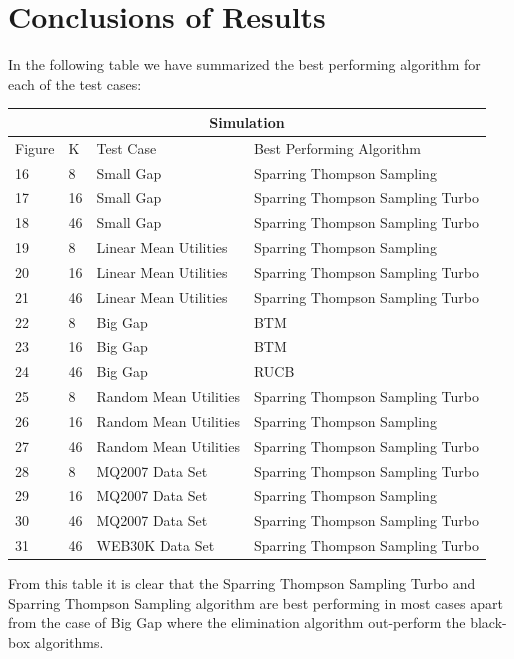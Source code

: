 \documentclass[MSc,beforeExam]{iitcsthesis}
\begin{document}
\section{Conclusions of Results}
In the following table we have summarized the best performing algorithm for each of the test cases:
\begin{table}[h!]
\centering
\begin{tabular}{ |p{1cm}|p{1cm}|p{4cm}|p{5cm}| }

\hline
 \multicolumn{4}{|c|}{Simulation} \\
 \hline
   \hline
Figure & K & Test Case & Best Performing Algorithm\\
\hline
  16     & 8  & Small Gap & Sparring Thompson Sampling\\
  \hline
  17     & 16  &  Small Gap & Sparring Thompson Sampling Turbo\\
  \hline
  18     & 46  &  Small Gap & Sparring Thompson Sampling Turbo\\
  \hline
  19     & 8  &  Linear Mean Utilities & Sparring Thompson Sampling\\
  \hline
  20     & 16  & Linear Mean Utilities & Sparring Thompson Sampling Turbo\\
  \hline
  21     & 46  & Linear Mean Utilities & Sparring Thompson Sampling Turbo \\
  \hline
  22     & 8  &  Big Gap & BTM \\
  \hline
  23     & 16  &  Big Gap & BTM \\
  \hline
  24     & 46  &  Big Gap & RUCB\\

  \hline
  25     & 8  &  Random Mean Utilities & Sparring Thompson Sampling Turbo \\
  \hline
  26     & 16  &  Random Mean Utilities & Sparring Thompson Sampling \\
  \hline
  27     & 46  &  Random Mean Utilities & Sparring Thompson Sampling Turbo \\
  \hline
  28     & 8  &  MQ2007 Data Set & Sparring Thompson Sampling Turbo\\
  \hline
  29     & 16  & MQ2007 Data Set & Sparring Thompson Sampling \\
  \hline
  30     & 46  & MQ2007 Data Set & Sparring Thompson Sampling Turbo \\
  \hline
  31     & 46  & WEB30K Data Set & Sparring Thompson Sampling Turbo \\
  \hline
\end{tabular}
\end{table}
From this table it is clear that the Sparring Thompson Sampling Turbo and Sparring Thompson Sampling algorithm are best performing in most cases apart from the case of Big Gap where the elimination algorithm out-perform the black-box algorithms.
\end{document}
